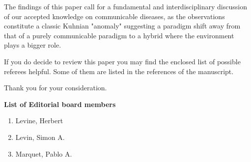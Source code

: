 \documentclass[11pt,a4paper,roman]{moderncv}
\begin{document}
The findings of this paper call for a fundamental and interdisciplinary discussion of our accepted knowledge on communicable diseases, as the observations constitute a classic Kuhnian "anomaly" suggesting a paradigm shift away from that of a purely communicable paradigm to a hybrid where the environment plays a bigger role.

If you do decide to review this paper you may find the enclosed list of possible referees helpful. 
Some of them are listed in the references of the manuscript. 

Thank you for your consideration.

\makeletterclosing
\newpage

\textbf{List of Editorial board members}
\begin{enumerate}
\item Levine, Herbert
\item Levin, Simon A.
\item Marquet, Pablo A.
\end{enumerate}
\end{document}
